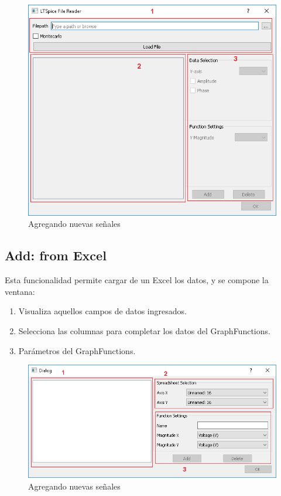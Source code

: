 \documentclass[a4paper,10pt]{article}
\begin{document}
\begin{figure}[H]
\begin{center}
	\includegraphics[scale=0.8]{resources/ltspice.png}
	\caption{Agregando nuevas se\~nales}
\end{center}
\end{figure}

\subsection{Add: from Excel}
Esta funcionalidad permite cargar de un Excel los datos, y se compone la ventana:
\begin{enumerate}
	\item Visualiza aquellos campos de datos ingresados.
	\item Selecciona las columnas para completar los datos del GraphFunctions.
	\item Par\'ametros del GraphFunctions.
\end{enumerate}

\begin{figure}[H]
\begin{center}
	\includegraphics[scale=0.8]{resources/excel.png}
	\caption{Agregando nuevas se\~nales}
\end{center}
\end{figure}
\end{document}
